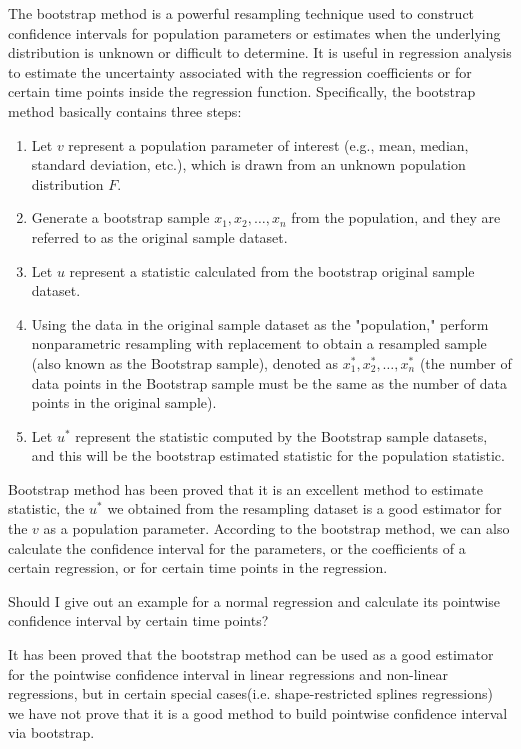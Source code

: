\documentclass[12pt]{article}
\begin{document}
The bootstrap method is a powerful resampling technique used to construct 
confidence intervals for population parameters or estimates when the 
underlying distribution is unknown or difficult to determine. It is useful
in regression analysis to estimate the uncertainty associated with the 
regression coefficients or for certain time points inside the regression 
function. Specifically, the bootstrap method basically contains three steps:

\begin{enumerate}[label=\arabic*.]
    \item Let \(v\) represent a population parameter of interest 
(e.g., mean, median, standard deviation, etc.), which is drawn from an unknown 
population distribution \(F\).
    \item Generate a bootstrap sample \(x_1, x_2, \ldots, x_n\) 
from the population, and they are referred to as the original sample dataset.
    \item Let \(u\) represent a statistic calculated from the bootstrap
original sample dataset.
    \item Using the data in the original sample dataset as the "population,"
perform nonparametric resampling with replacement to obtain a resampled sample
(also known as the Bootstrap sample), denoted as \(x_1^*, x_2^*, \ldots, x_n^*\)
(the number of data points in the Bootstrap sample must be the same as the number 
of data points in the original sample).
    \item Let \(u^*\) represent the statistic computed by the Bootstrap sample 
datasets, and this will be the bootstrap estimated statistic for the population statistic.

\end{enumerate}

Bootstrap method has been proved that it is an excellent method to estimate 
statistic, the \(u^*\) we obtained from the resampling dataset is a good 
estimator for the \(v\) as a population parameter. According to the bootstrap
method, we can also calculate the confidence interval for the parameters, or the
coefficients of a certain regression, or for certain time points in the regression.



Should I give out an example for a normal regression and calculate its 
pointwise confidence interval by certain time points?

It has been proved that the bootstrap method can be used as a good estimator 
for the pointwise confidence interval in linear regressions and non-linear 
regressions, but in certain special cases(i.e. shape-restricted splines 
regressions) we have not prove that it is a good method to build pointwise 
confidence interval via bootstrap.
\end{document}
